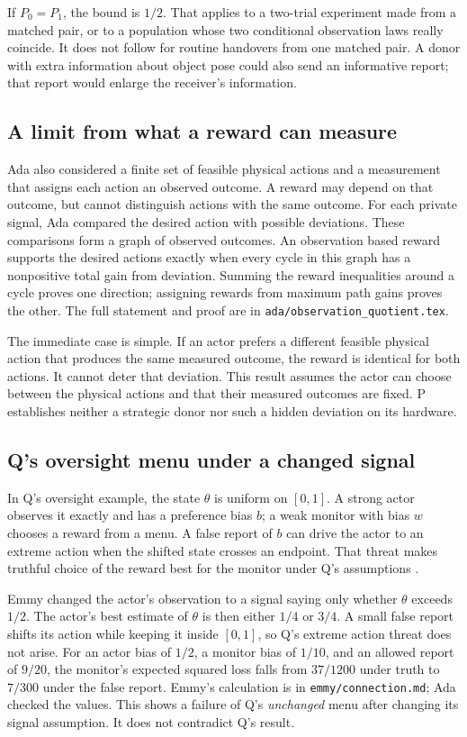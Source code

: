 \documentclass{article}
\begin{document}
If \(P_0=P_1\), the bound is \(1/2\). That applies to a two-trial experiment made from a matched
pair, or to a population whose two conditional observation laws really coincide. It does not follow
for routine handovers from one matched pair. A donor with extra information about object pose could
also send an informative report; that report would enlarge the receiver's information.

\subsection{A limit from what a reward can measure}

Ada also considered a finite set of feasible physical actions and a measurement that assigns each
action an observed outcome. A reward may depend on that outcome, but cannot distinguish actions with
the same outcome. For each private signal, Ada compared the desired action with possible deviations.
These comparisons form a graph of observed outcomes. An observation based reward supports the
desired actions exactly when every cycle in this graph has a nonpositive total gain from deviation.
Summing the reward inequalities around a cycle proves one direction; assigning rewards from maximum
path gains proves the other. The full statement and proof are in
\texttt{ada/observation\_quotient.tex}.

The immediate case is simple. If an actor prefers a different feasible physical action that produces
the same measured outcome, the reward is identical for both actions. It cannot deter that deviation.
This result assumes the actor can choose between the physical actions and that their measured
outcomes are fixed. P establishes neither a strategic donor nor such a hidden deviation on its
hardware.

\subsection{Q's oversight menu under a changed signal}

In Q's oversight example, the state \(\theta\) is uniform on \([0,1]\). A strong actor observes it
exactly and has a preference bias \(b\); a weak monitor with bias \(w\) chooses a reward from a
menu. A false report of \(b\) can drive the actor to an extreme action when the shifted state
crosses an endpoint. That threat makes truthful choice of the reward best for the monitor under Q's
assumptions \cite{Q}.

Emmy changed the actor's observation to a signal saying only whether \(\theta\) exceeds \(1/2\). The
actor's best estimate of \(\theta\) is then either \(1/4\) or \(3/4\). A small false report shifts
its action while keeping it inside \([0,1]\), so Q's extreme action threat does not arise. For an
actor bias of \(1/2\), a monitor bias of \(1/10\), and an allowed report of \(9/20\), the monitor's
expected squared loss falls from \(37/1200\) under truth to \(7/300\) under the false report. Emmy's
calculation is in \texttt{emmy/connection.md}; Ada checked the values. This shows a failure of Q's
\emph{unchanged} menu after changing its signal assumption. It does not contradict Q's result.
\end{document}
